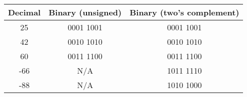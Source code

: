 \begin{solution}[0.5in]
\begin{center}
  \begin{tabular}{|c|c|c|}
    \hline
    Decimal & Binary (unsigned) & Binary (two's complement) \\
    \hline\hline
    25 & 0001 1001 & 0001 1001 \\
    \hline
    42 & 0010 1010 & 0010 1010 \\
    \hline
    60 & 0011 1100 & 0011 1100 \\
    \hline
    -66 & N/A & 1011 1110 \\
    \hline
    -88 & N/A & 1010 1000 \\
    \hline
  \end{tabular}
\end{center}
\end{solution}

